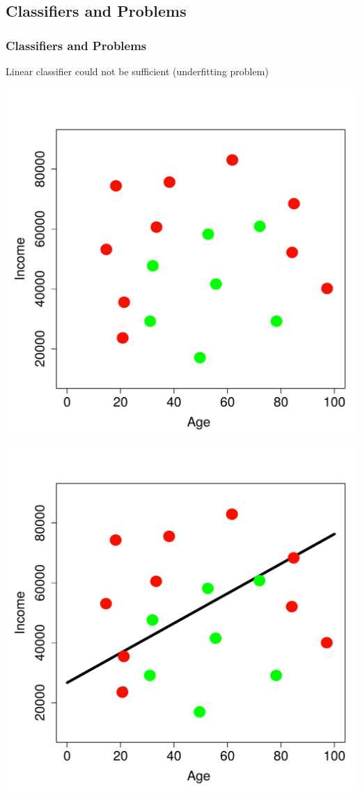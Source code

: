 \documentclass{beamer}
\begin{document}
\subsection{Classifiers and Problems}
\begin{frame}
  \frametitle{Classifiers and Problems}
    Linear classifier could not be sufficient (underfitting problem)
  	\begin{center}
	\includegraphics[scale=0.3]{fmlpda_figure_1_3_a}
	\includegraphics[scale=0.3]{fmlpda_figure_1_3_b}
	\end{center}
\end{frame}
\end{document}
